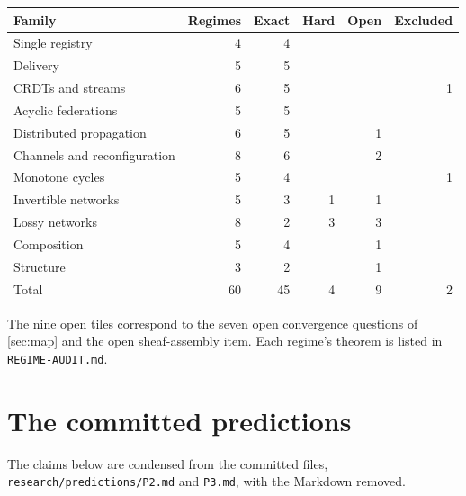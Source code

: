 \begin{center}\small
\begin{tabular}{@{}lrrrrr@{}}
\toprule
Family & Regimes & Exact & Hard & Open & Excluded \\
\midrule
Single registry & 4 & 4 & & & \\
Delivery & 5 & 5 & & & \\
CRDTs and streams & 6 & 5 & & & 1 \\
Acyclic federations & 5 & 5 & & & \\
Distributed propagation & 6 & 5 & & 1 & \\
Channels and reconfiguration & 8 & 6 & & 2 & \\
Monotone cycles & 5 & 4 & & & 1 \\
Invertible networks & 5 & 3 & 1 & 1 & \\
Lossy networks & 8 & 2 & 3 & 3 & \\
Composition & 5 & 4 & & 1 & \\
Structure & 3 & 2 & & 1 & \\
\midrule
Total & 60 & 45 & 4 & 9 & 2 \\
\bottomrule
\end{tabular}
\end{center}

\noindent The nine open tiles correspond to the seven open convergence questions of \cref{sec:map} and
the open sheaf-assembly item. Each regime's theorem is listed in \texttt{REGIME-AUDIT.md}.

\section{The committed predictions}\label{app:predictions}

The claims below are condensed from the committed files, \texttt{research/predictions/P2.md} and
\texttt{P3.md}, with the Markdown removed.

